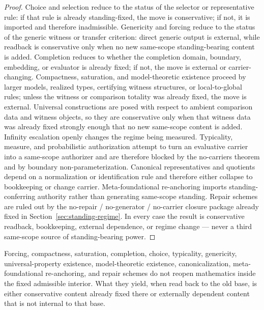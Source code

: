 \begin{proof}
Choice and selection reduce to the status of the selector or representative rule: if that rule is already standing-fixed, the move is conservative; if not, it is imported and therefore inadmissible. Genericity and forcing reduce to the status of the generic witness or transfer criterion: direct generic output is external, while readback is conservative only when no new same-scope standing-bearing content is added. Completion reduces to whether the completion domain, boundary, embedding, or evaluator is already fixed; if not, the move is external or carrier-changing. Compactness, saturation, and model-theoretic existence proceed by larger models, realized types, certifying witness structures, or local-to-global rules; unless the witness or comparison totality was already fixed, the move is external. Universal constructions are posed with respect to ambient comparison data and witness objects, so they are conservative only when that witness data was already fixed strongly enough that no new same-scope content is added. Infinity escalation openly changes the regime being measured. Typicality, measure, and probabilistic authorization attempt to turn an evaluative carrier into a same-scope authorizer and are therefore blocked by the no-carriers theorem and by boundary non-parameterization. Canonical representatives and quotients depend on a normalization or identification rule and therefore either collapse to bookkeeping or change carrier. Meta-foundational re-anchoring imports standing-conferring authority rather than generating same-scope standing. Repair schemes are ruled out by the no-repair / no-generator / no-carrier closure package already fixed in Section~\ref{sec:standing-regime}. In every case the result is conservative readback, bookkeeping, external dependence, or regime change --- never a third same-scope source of standing-bearing power.
\end{proof}

\begin{corollary}
Forcing, compactness, saturation, completion, choice, typicality, genericity, universal-property existence, model-theoretic existence, canonicalization, meta-foundational re-anchoring, and repair schemes do not reopen mathematics inside the fixed admissible interior. What they yield, when read back to the old base, is either conservative content already fixed there or externally dependent content that is not internal to that base.
\end{corollary}

